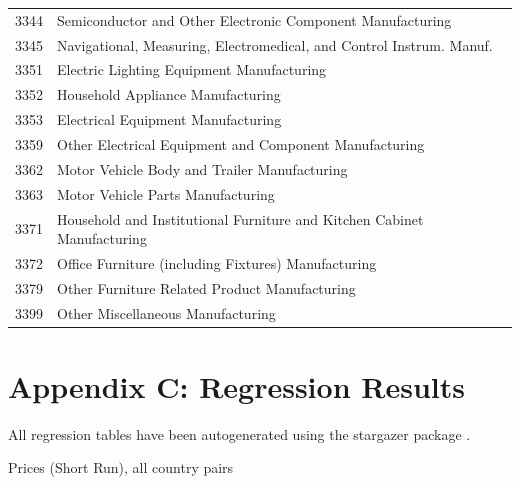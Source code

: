 \begin{spacing}{1}
\begin{longtable}{cl}
3344 &	Semiconductor and Other Electronic Component Manufacturing \\
3345 &	Navigational, Measuring, Electromedical, and Control Instrum. Manuf. \\
3351 &	Electric Lighting Equipment Manufacturing \\
3352 &	Household Appliance Manufacturing \\
3353 &	Electrical Equipment Manufacturing \\
3359 &	Other Electrical Equipment and Component Manufacturing \\
3362 &	Motor Vehicle Body and Trailer Manufacturing \\
3363 &	Motor Vehicle Parts Manufacturing \\
3371 &	Household and Institutional Furniture and Kitchen Cabinet Manufacturing \\
3372 &	Office Furniture (including Fixtures) Manufacturing \\
3379 &	Other Furniture Related Product Manufacturing \\
3399 &	Other Miscellaneous Manufacturing \\
\end{longtable}
\end{spacing}
\clearpage

\section{Appendix C: Regression Results}
All regression tables have been autogenerated using the stargazer package \citep{Hlavac2014}.

\begin{table}[h!b]
\tiny
\begin{center}\caption{Prices (Short Run), all country pairs\label{tb:prices_sr}}

\end{center}
\end{table}
\clearpage

